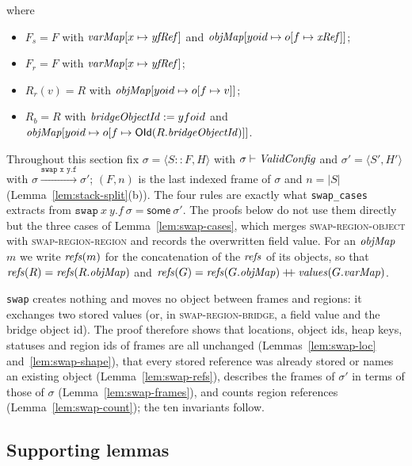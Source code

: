 where
\begin{itemize}[nosep]
  \item $F_s = F$ with $\mathit{varMap}[x \mapsto \mathit{yfRef}]$ and $\mathit{objMap}[yoid \mapsto o[f \mapsto \mathit{xRef}]]$;
  \item $F_r = F$ with $\mathit{varMap}[x \mapsto \mathit{yfRef}]$;
  \item $R_r(v) = R$ with $\mathit{objMap}[yoid \mapsto o[f \mapsto v]]$;
  \item $R_b = R$ with $\mathit{bridgeObjectId} := yfoid$ and $\mathit{objMap}[yoid \mapsto o[f \mapsto \mathsf{OId}(R.\mathit{bridgeObjectId})]]$.
\end{itemize}

Throughout this section fix $\sigma = \langle S :: F, H\rangle$ with $\sigma \vdash \textit{ValidConfig}$
and $\sigma' = \langle S', H'\rangle$ with $\sigma \xrightarrow{\texttt{swap x y.f}} \sigma'$;
$(F, n)$ is the last indexed frame of $\sigma$ and $n = |S|$ (Lemma~\ref{lem:stack-split}(b)). The four rules are exactly what
\texttt{swap\_cases} extracts from $\texttt{swap}\ x\ y.f\ \sigma = \mathsf{some}\ \sigma'$. The
proofs below do not use them directly but the three cases of Lemma~\ref{lem:swap-cases}, which merges
\textsc{swap-region-object} with \textsc{swap-region-region} and records the overwritten field value.
For an $\mathit{objMap}$ $m$ we write $\mathit{refs}(m)$ for the concatenation of the $\mathit{refs}$ of its objects, so that
$\mathit{refs}(R) = \mathit{refs}(R.\mathit{objMap})$ and $\mathit{refs}(G) = \mathit{refs}(G.\mathit{objMap}) \mathbin{+\!\!+} \mathit{values}(G.\mathit{varMap})$.

\texttt{swap} creates nothing and moves no object between frames and regions: it exchanges two stored
values (or, in \textsc{swap-region-bridge}, a field value and the bridge object id). The proof
therefore shows that locations, object ids, heap keys, statuses and region ids of frames are all
unchanged (Lemmas~\ref{lem:swap-loc} and~\ref{lem:swap-shape}), that every stored reference was
already stored or names an existing object (Lemma~\ref{lem:swap-refs}), describes the frames of
$\sigma'$ in terms of those of $\sigma$ (Lemma~\ref{lem:swap-frames}), and counts region references
(Lemma~\ref{lem:swap-count}); the ten invariants follow.

\subsection{Supporting lemmas}


